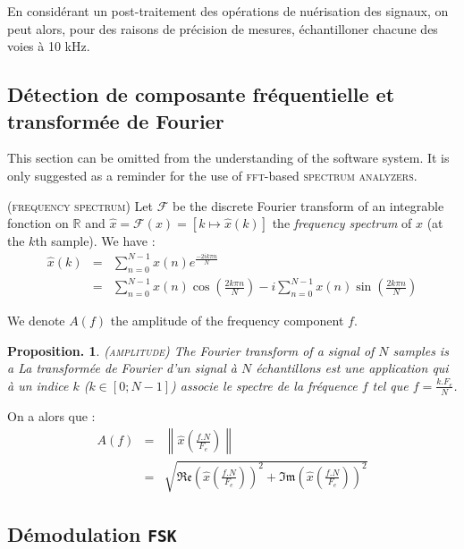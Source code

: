 \documentclass[twocolumn,pre,floats,aps,amsmath,amssymb]{revtex4}
\newtheorem{proposition}[theorem]{Proposition.}
\newenvironment{definition}[1][D\'efinition.]{\begin{trivlist}
\item[\hskip \labelsep {\bfseries #1}]}{\end{trivlist}}
\begin{document}
En consid\'erant un post-traitement des op\'erations de nu\'erisation des signaux, on peut alors, pour des raisons de pr\'ecision de mesures, \'echantilloner chacune des voies \`a 10 kHz.

\subsection{D\'etection de composante fr\'equentielle et transform\'ee de Fourier}

{ \color{rltred}{\Radioactivity} } This section can be omitted from the understanding of the software system. It is only suggested as a reminder for the use of \textsc{fft}-based \textsc{spectrum analyzers}.

\begin{definition}
\textsc{(frequency spectrum)}
Let $\mathcal{F}$ be the discrete Fourier transform of an integrable fonction on $\mathbb{R}$ and $\hat{x} = \mathcal{F}(x) = \left [ k \mapsto \hat{x}(k)\right ]$ the \textit{frequency spectrum} of $x$ (at the $k$th sample). We have\cite{Senlis} :
\begin{eqnarray*}
\hat{x}(k) &=& \sum^{N - 1}_{n = 0}{x(n)e^{\frac{-2ik \pi n}{N}}}\\
           &=& \sum^{N - 1}_{n = 0}{x(n)\cos \left ( \frac{2k \pi n}{N} \right )} - i\sum^{N - 1}_{n = 0}{x(n)\sin \left ( \frac{2k \pi n}{N} \right )}
\end{eqnarray*}
\end{definition}

We denote $A (f)$ the amplitude of the frequency component $f$.

\begin{proposition}
\textsc{(amplitude)}
The Fourier transform of a signal of $N$ samples is a 
La transform\'ee de Fourier d'un signal \`a $N$ \'echantillons est une application qui \`a un indice $k$ ($k \in [0 ; N - 1]$) associe le spectre de la fr\'equence $f$ tel que $f = \frac{k.F_e}{N}$.
\end{proposition}

On a alors que\cite{Senlis} :
\begin{eqnarray*}
  A (f) &=& \left \| \hat{x} \left (\frac{f.N}{F_e} \right ) \right \|\\
           &=& \sqrt{\mathfrak{Re} \left ( \hat{x} \left (\frac{f.N}{F_e} \right ) \right )^2 + \mathfrak{Im} \left ( \hat{x} \left (\frac{f.N}{F_e} \right ) \right )^2}
\end{eqnarray*}

\subsection{D\'emodulation \texttt{FSK}}
\end{document}
